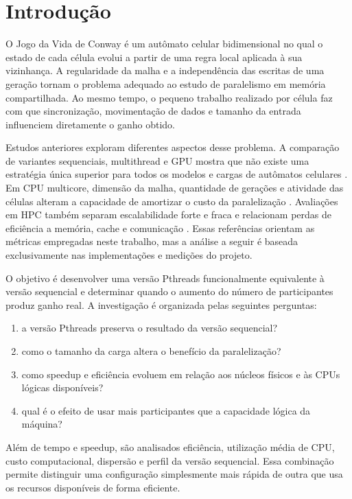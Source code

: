 \documentclass[12pt,a4paper]{article}
\begin{document}
\tableofcontents
\clearpage
{}

\section{Introdução}

O Jogo da Vida de Conway é um autômato celular bidimensional no qual o estado
de cada célula evolui a partir de uma regra local aplicada à sua vizinhança. A
regularidade da malha e a independência das escritas de uma geração tornam o
problema adequado ao estudo de paralelismo em memória compartilhada. Ao mesmo
tempo, o pequeno trabalho realizado por célula faz com que sincronização,
movimentação de dados e tamanho da entrada influenciem diretamente o ganho
obtido.

Estudos anteriores exploram diferentes aspectos desse problema. A comparação
de variantes sequenciais, multithread e GPU mostra que não existe uma estratégia
única superior para todos os modelos e cargas de autômatos celulares
\parencite{rybacki2009experiments}. Em CPU multicore, dimensão da malha,
quantidade de gerações e atividade das células alteram a capacidade de amortizar
o custo da paralelização \parencite{gibson2015efficient}. Avaliações em HPC
também separam escalabilidade forte e fraca e relacionam perdas de eficiência a
memória, cache e comunicação \parencite{millan2015performance}. Essas
referências orientam as métricas empregadas neste trabalho, mas a análise a
seguir é baseada exclusivamente nas implementações e medições do projeto.

O objetivo é desenvolver uma versão Pthreads funcionalmente equivalente à
versão sequencial e determinar quando o aumento do número de participantes
produz ganho real. A investigação é organizada pelas seguintes perguntas:

\begin{enumerate}
    \item a versão Pthreads preserva o resultado da versão sequencial?
    \item como o tamanho da carga altera o benefício da paralelização?
    \item como speedup e eficiência evoluem em relação aos núcleos físicos e às
    CPUs lógicas disponíveis?
    \item qual é o efeito de usar mais participantes que a capacidade lógica da
    máquina?
\end{enumerate}

Além de tempo e speedup, são analisados eficiência, utilização média de CPU,
custo computacional, dispersão e perfil da versão sequencial. Essa combinação
permite distinguir uma configuração simplesmente mais rápida de outra que usa
os recursos disponíveis de forma eficiente.
\end{document}
